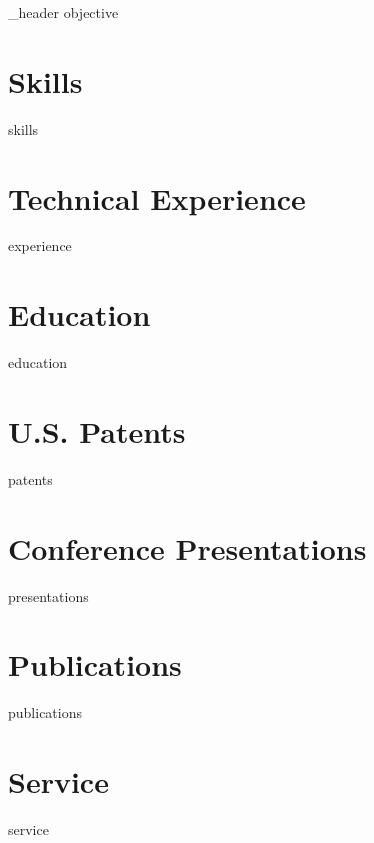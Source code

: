 \documentclass[letter,10pt]{article}
\author{Joelle Tori Maslak} %
\begin{document}
{_header}
{objective}

\raggedright

\section{Skills}
{skills}

\section{Technical Experience}
{experience}

\section{Education}
{education}

\section{U.S. Patents}
{patents}

\section{Conference Presentations}
{presentations}

\section{Publications}
{publications}

\section{Service}
{service}
\end{document}
